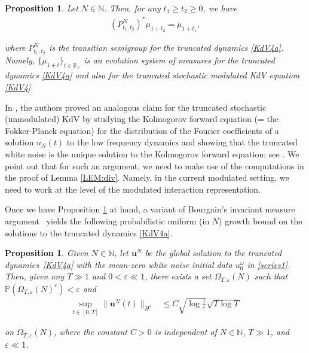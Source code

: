 \documentclass[letterpaper, 11pt,  reqno]{amsart}
\newtheorem{proposition}[theorem]{Proposition}
\newcommand{\1}{\hspace{0.5mm}\text{I}\hspace{0.5mm}}
\newcommand{\noi}{\noindent}
\newcommand{\R}{\mathbb{R}}
\newcommand{\NB}{\mathbb{N}}
\newcommand{\eps}{\varepsilon}
\renewcommand{\o}{\omega}
\newcommand{\uu}{\mathbf{u}}
\numberwithin{equation}{section}
\numberwithin{theorem}{section}
\begin{document}
\begin{proposition}\label{PROP:finite}
Let $N \in \NB$. 
Then, for any $t_1 \ge t_2 \ge 0$, we have 
\begin{align*}
(P^{N}_{t_1, t_2})^* \mu_{1+t_2}
=   \mu_{1+t_1 }, 
\end{align*}

\noi
where 
  $P^{N}_{t_1, t_2}$
is  the transition semigroup for the truncated dynamics \eqref{KdV4a}.
Namely, $\{\mu_{1+t}\}_{t \in \R_+}$
is an evolution system of measures
for the truncated dynamics \eqref{KdV4a}
and also for the truncated
stochastic modulated KdV equation \eqref{KdV4}.
\end{proposition}



In \cite{OQS}, 
the authors proved an analogous claim
for the truncated stochastic (unmodulated) KdV 
by studying 
 the  Kolmogorov forward equation 
(= the Fokker-Planck equation)
 for the distribution 
 of the Fourier coefficients
 of a solution $u_N(t)$ to the low frequency dynamics
 and showing that the truncated white noise
 is the unique  solution to the 
  Kolmogorov forward equation;
 see \cite[Section 2]{OQS}.
We point out that for such an argument, 
we need to make use of the computations in the proof of Lemma \ref{LEM:div}.
Namely, in the current modulated setting, 
we need to work at the level of the modulated interaction representation.








Once we have
Proposition \ref{PROP:finite} at hand, 
 a variant of 
 Bourgain's invariant measure argument~\cite{BO94}
 yields
 the following 
probabilistic  uniform (in $N$) growth bound 
on the solutions to the truncated dynamics \eqref{KdV4a}.


 
\begin{proposition}\label{PROP:main1}
Given $N \in \NB$, let $\uu^N$ be the global solution to the truncated dynamics~\eqref{KdV4a}
with the mean-zero white noise initial data $u_0^\o$ in \eqref{series1}.
Then, 
given any  $T\gg1$ and $0 < \eps\ll 1$, there exists a set  $\Omega_{T,\eps}(N)$ such that 
$\mathbb{P}(\Omega_{T,\eps}(N)^c)<\eps$ and
  \begin{align}
    \sup_{t\in [0,T]}\|\uu^N(t)\|_{H^s}&\le  C
 \sqrt {\log \frac 1 \eps}\sqrt{T \log T}
\label{growth1}
  \end{align}

\noi
on $\Omega_{T,\eps}(N)$, 
where the constant $C > 0$ is independent of $N \in \NB$, $T\gg1$, and $\eps \ll 1$.

\end{proposition}
\end{document}

